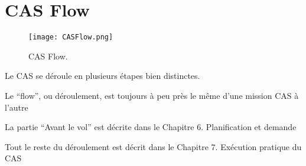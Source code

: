 \chapter{CAS Flow}

\begin{figure}[H]
    \texttt{[image: CASFlow.png]}
    \caption{CAS Flow.}
    \label{fig:casflow}
\end{figure}

\e
    \item Le CAS se déroule en plusieurs étapes bien distinctes.
    \item Le ``flow'', ou déroulement, est toujours à peu près le même d’une mission CAS à l’autre
    \item La partie ``Avant le vol'' est décrite dans le Chapitre 6. Planification et demande %
    \item Tout le reste du déroulement est décrit dans le Chapitre 7. Exécution pratique du CAS %
\ed 